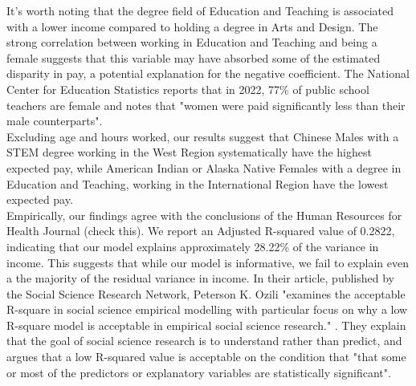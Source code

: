\documentclass{article}
\begin{document}
It's worth noting that the degree field of Education and Teaching is associated with a lower income compared to holding a degree in Arts and Design.
The strong correlation between working in Education and Teaching and being a female suggests that this variable may have absorbed some of the estimated disparity in pay, a potential explanation for the negative coefficient.
The National Center for Education Statistics reports that in 2022, 77\% of public school teachers are female and notes that "women were paid significantly less than their male counterparts"\cite{public-school}.
\\

Excluding age and hours worked, our results suggest that Chinese Males with a STEM degree working in the West Region systematically have the highest expected pay, while American Indian or Alaska Native Females with a degree in Education and Teaching, working in the International Region have the lowest expected pay.
\\

Empirically, our findings agree with the conclusions of the Human Resources for Health Journal (check this).
We report an Adjusted R-squared value of 0.2822, indicating that our model explains approximately 28.22\% of the variance in income.
This suggests that while our model is informative, we fail to explain even a the majority of the residual variance in income.
In their article, published by the Social Science Research Network, Peterson K. Ozili "examines the acceptable R-square in social science empirical modelling with particular focus on why a low R-square model is acceptable in empirical social science research." \cite{ozili}.
They explain that the goal of social science research is to understand rather than predict, and argues that a low R-squared value is acceptable on the condition that "that some or most of the predictors or explanatory variables are statistically significant"\cite{ozili}.
\\
\end{document}
